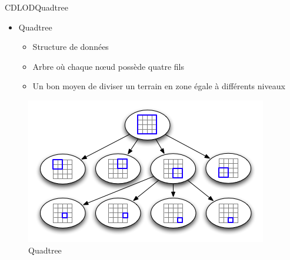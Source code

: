\documentclass[french]{beamer}
\begin{document}
\begin{frame}{CDLOD}{Quadtree}


\begin{itemize}

    \item Quadtree
    \begin{itemize}
        \item Structure de données
        \item Arbre où chaque n\oe{}ud possède quatre fils
        \item Un bon moyen de diviser un terrain en zone égale à différents niveaux
        
        
    \end{itemize}
\end{itemize}

\begin{figure}
   \includegraphics[scale=0.40]{img/quadtree-arbre.png}
   \caption{Quadtree \protect\footnotemark}
\end{figure}
    
\end{frame}
\end{document}
